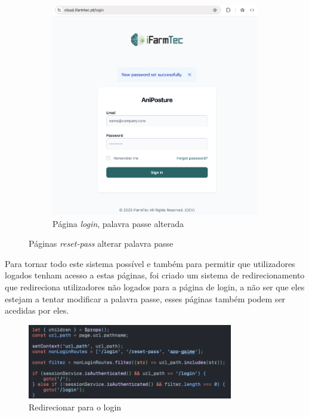 \begin{figure}[!h]
\begin{subfigure}[c]{0.35\textwidth}
		\includegraphics[width=\textwidth]{figs/reset-pass-4.png}
		\caption{Página \textit{login}, palavra passe alterada}
		\label{fig:resetPassResetSuc}
	\end{subfigure}
	\caption{Páginas \textit{reset-pass} alterar palavra passe}
    \label{fig:pagResetPassReset}
\end{figure}

Para tornar todo este sistema possível e também para permitir que utilizadores logados tenham acesso a estas páginas, foi criado um sistema de redirecionamento que redireciona utilizadores não logados para a página de login, a não ser que eles estejam a tentar modificar a palavra passe, esses páginas também podem ser acedidas por eles. 

\begin{figure}[h!]
    \centering
    \includegraphics[width=0.8\textwidth]{figs/redirectLogin.png}
    \caption{Redirecionar para o login}
    \label{fig:redirectLogin}
\end{figure}

